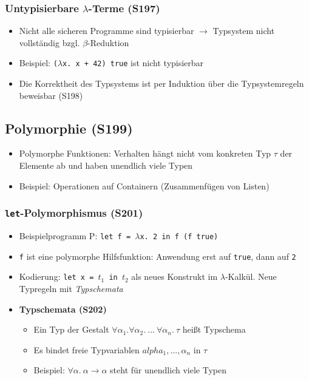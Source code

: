 \subsubsection{Untypisierbare \(\lambda\)-Terme (S197)}
\begin{itemize}
	\item Nicht alle sicheren Programme sind typisierbar \(\rightarrow\) Typsystem nicht vollständig bzgl. \(\beta\)-Reduktion
	\item Beispiel: \texttt{(\(\lambda\)x. x + 42) true} ist nicht typisierbar
	\item Die Korrektheit des Typsystems ist per Induktion über die Typsystemregeln beweisbar (S198)
\end{itemize}


\subsection{Polymorphie (S199)}
\begin{itemize}
	\item Polymorphe Funktionen: Verhalten hängt nicht vom konkreten Typ \(\tau\) der Elemente ab und haben unendlich viele Typen
	\item Beispiel: Operationen auf Containern (Zusammenfügen von Listen)
\end{itemize}

\subsubsection{\texttt{let}-Polymorphismus (S201)}
\begin{itemize}
	\item Beispielprogramm P: \texttt{let f = \(\lambda\)x. 2 in f (f true)}
	\item \texttt{f} ist eine polymorphe Hilfsfunktion: Anwendung erst auf \texttt{true}, dann auf \texttt{2}
	\item Kodierung: \texttt{let x = \(t_1\) in \(t_2\)} als neues Konstrukt im \(\lambda\)-Kalkül. Neue Typregeln mit \textit{Typschemata}
	\item \textbf{Typschemata (S202)}
	\begin{itemize}
		\item Ein Typ der Gestalt \(\forall\alpha_1.\forall\alpha_2.~...~\forall\alpha_n.~\tau\) heißt Typschema
		\item Es bindet freie Typvariablen \(alpha_1,...,\alpha_n\) in \(\tau\)
		\item Beispiel: \(\forall\alpha.~\alpha\rightarrow\alpha\) steht für unendlich viele Typen
	\end{itemize}
\end{itemize}


